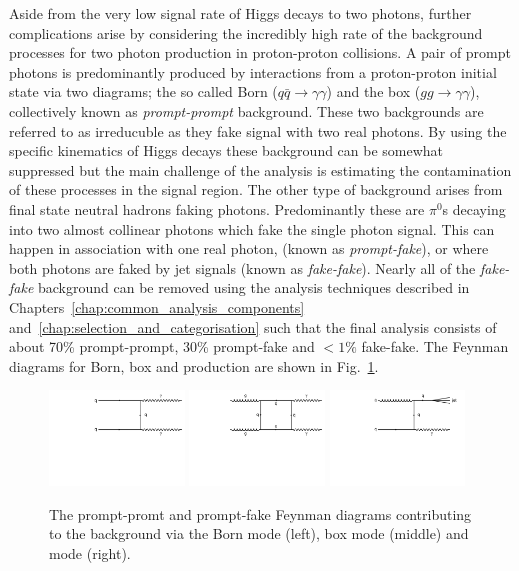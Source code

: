 Aside from the very low signal rate of Higgs decays to two photons, further complications arise by considering the incredibly high rate of the background processes for two photon production in proton-proton collisions. A pair of prompt photons is predominantly produced by \QCD interactions from a proton-proton initial state via two diagrams; the so called Born ($q\bar{q}\rightarrow\gamma\gamma$) and the box ($gg\rightarrow\gamma\gamma$), collectively known as \textit{prompt-prompt} background. These two backgrounds are referred to as irreducuble as they fake signal with two real photons. By using the specific kinematics of Higgs decays these background can be somewhat suppressed but the main challenge of the analysis is estimating the contamination of these processes in the signal region. The other type of background arises from final state neutral hadrons faking photons. Predominantly these are $\pi^{0}$s decaying into two almost collinear photons which fake the single photon signal. This can happen in association with one real photon, \gjet (known as \textit{prompt-fake}), or where both photons are faked by jet signals (known as \textit{fake-fake}). Nearly all of the \textit{fake-fake} background can be removed using the analysis techniques described in Chapters~\ref{chap:common_analysis_components} and~\ref{chap:selection_and_categorisation} such that the final analysis consists of about 70\% prompt-prompt, 30\% prompt-fake and $<1\%$ fake-fake. The Feynman diagrams for Born, box and \gjet production are shown in Fig.~\ref{fig:feyn_bkgs}.
\begin{figure}
  \includegraphics[width=0.32\textwidth]{theory/plots/Born.pdf}
  \includegraphics[width=0.32\textwidth]{theory/plots/Box.pdf}
  \includegraphics[width=0.32\textwidth]{theory/plots/GJet.pdf}
  \caption[Higgs to two photon backgrounds at the \LHC]{The prompt-promt and prompt-fake Feynman diagrams contributing to the \Hgg background via the Born mode (left), box mode (middle) and \gjet mode (right).}
  \label{fig:feyn_bkgs}
\end{figure}
